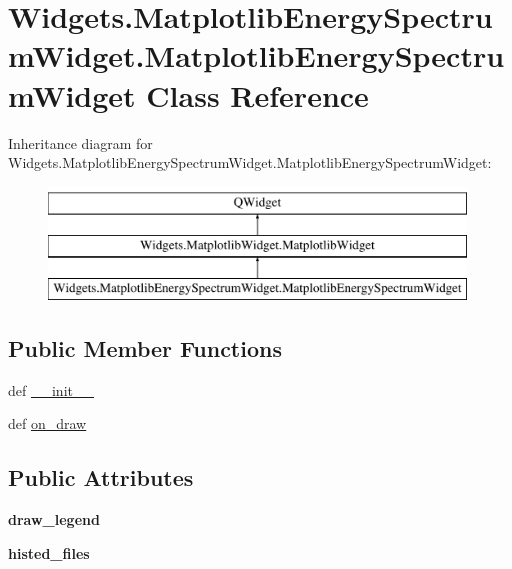 \hypertarget{classWidgets_1_1MatplotlibEnergySpectrumWidget_1_1MatplotlibEnergySpectrumWidget}{\section{Widgets.\-Matplotlib\-Energy\-Spectrum\-Widget.\-Matplotlib\-Energy\-Spectrum\-Widget Class Reference}
\label{classWidgets_1_1MatplotlibEnergySpectrumWidget_1_1MatplotlibEnergySpectrumWidget}
}
Inheritance diagram for Widgets.\-Matplotlib\-Energy\-Spectrum\-Widget.\-Matplotlib\-Energy\-Spectrum\-Widget\-:\begin{figure}[H]
\begin{center}
\leavevmode
\includegraphics[height=3.000000cm]{classWidgets_1_1MatplotlibEnergySpectrumWidget_1_1MatplotlibEnergySpectrumWidget}
\end{center}
\end{figure}
\subsection*{Public Member Functions}
\begin{DoxyCompactItemize}
\item 
def \hyperlink{classWidgets_1_1MatplotlibEnergySpectrumWidget_1_1MatplotlibEnergySpectrumWidget_a311b6797d20e3a09541dade43ec451dd}{\-\_\-\-\_\-init\-\_\-\-\_\-}
\item 
def \hyperlink{classWidgets_1_1MatplotlibEnergySpectrumWidget_1_1MatplotlibEnergySpectrumWidget_a4f9443abd209aafb45e790e6cb4c4e73}{on\-\_\-draw}
\end{DoxyCompactItemize}
\subsection*{Public Attributes}
\begin{DoxyCompactItemize}
\item 
\hypertarget{classWidgets_1_1MatplotlibEnergySpectrumWidget_1_1MatplotlibEnergySpectrumWidget_a1e747851d4852985bc8c6c719a7e61d4}{{\bfseries draw\-\_\-legend}}\label{classWidgets_1_1MatplotlibEnergySpectrumWidget_1_1MatplotlibEnergySpectrumWidget_a1e747851d4852985bc8c6c719a7e61d4}

\item 
\hypertarget{classWidgets_1_1MatplotlibEnergySpectrumWidget_1_1MatplotlibEnergySpectrumWidget_a4f68106982addccb44d6d79d0078d065}{{\bfseries histed\-\_\-files}}\label{classWidgets_1_1MatplotlibEnergySpectrumWidget_1_1MatplotlibEnergySpectrumWidget_a4f68106982addccb44d6d79d0078d065}

\end{DoxyCompactItemize}


